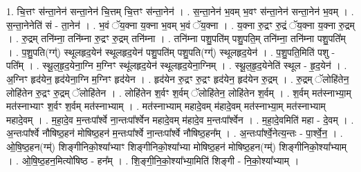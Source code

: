 \documentclass[17pt]{extarticle}
\begin{document}
1. चि॒त्तꣳ स॑न्ता॒नेन॑ सन्ता॒नेन॑ चि॒त्तम् चि॒त्तꣳ स॑न्ता॒नेन॑ । . स॒न्ता॒नेन॑ भ॒वम् भ॒वꣳ स॑न्ता॒नेन॑ सन्ता॒नेन॑ भ॒वम् । . स॒न्ता॒नेनेति॑ सं - ता॒नेन॑ । . भ॒वं ॅय॒क्ना य॒क्ना भ॒वम् भ॒वं ॅय॒क्ना । . य॒क्ना रु॒द्रꣳ रु॒द्रं ॅय॒क्ना य॒क्ना रु॒द्रम् । . रु॒द्रम् तनि॑म्ना॒ तनि॑म्ना रु॒द्रꣳ रु॒द्रम् तनि॑म्ना । . तनि॑म्ना पशु॒पति॑म् पशु॒पति॒म् तनि॑म्ना॒ तनि॑म्ना पशु॒पति᳚म् । . प॒शु॒पति(ग्ग्॑) स्थूलहृद॒येन॑ स्थूलहृद॒येन॑ पशु॒पति॑म् पशु॒पति(ग्ग्॑) स्थूलहृद॒येन॑ । . प॒शु॒पति॒मिति॑ पशु - पति᳚म् । . स्थू॒ल॒हृ॒द॒येना॒ग्नि म॒ग्निꣳ स्थू॑लहृद॒येन॑ स्थूलहृद॒येना॒ग्निम् । . स्थू॒ल॒हृ॒द॒येनेति॑ स्थूल - हृ॒द॒येन॑ । . अ॒ग्निꣳ हृद॑येन॒ हृद॑येना॒ग्नि म॒ग्निꣳ हृद॑येन । . हृद॑येन रु॒द्रꣳ रु॒द्रꣳ हृद॑येन॒ हृद॑येन रु॒द्रम् । . रु॒द्रम् ॅलोहि॑तेन॒ लोहि॑तेन रु॒द्रꣳ रु॒द्रम् ॅलोहि॑तेन । . लोहि॑तेन श॒र्वꣳ श॒र्वम् ॅलोहि॑तेन॒ लोहि॑तेन श॒र्वम् । . श॒र्वम् मत॑स्नाभ्या॒म् मत॑स्नाभ्याꣳ श॒र्वꣳ श॒र्वम् मत॑स्नाभ्याम् । . मत॑स्नाभ्याम् महादे॒वम् म॑हादे॒वम् मत॑स्नाभ्या॒म् मत॑स्नाभ्याम् महादे॒वम् । . म॒हा॒दे॒व म॒न्तःपा᳚र्श्वे ना॒न्तःपा᳚र्श्वेन महादे॒वम् म॑हादे॒व म॒न्तःपा᳚र्श्वेन । . म॒हा॒दे॒वमिति॑ महा - दे॒वम् । . अ॒न्तःपा᳚र्श्वे नौषिष्ठ॒हन॑ मोषिष्ठ॒हन॑ म॒न्तःपा᳚र्श्वे ना॒न्तःपा᳚र्श्वे नौषिष्ठ॒हन᳚म् । . अ॒न्तःपा᳚र्श्वे॒नेत्य॒न्तः - पा॒र्श्वे॒न॒ । . ओ॒षि॒ष्ठ॒हन(ग्म्॑) शिङ्गीनिको॒श्या᳚भ्याꣳ शिङ्गीनिको॒श्या᳚भ्या मोषिष्ठ॒हन॑ मोषिष्ठ॒हन(ग्म्॑) शिङ्गीनिको॒श्या᳚भ्याम् । . ओ॒षि॒ष्ठ॒हन॒मित्यो॑षिष्ठ - हन᳚म् । . शि॒ङ्गी॒नि॒को॒श्या᳚भ्या॒मिति॑ शिङ्गी - नि॒को॒श्या᳚भ्याम् । \newline
\end{document}
